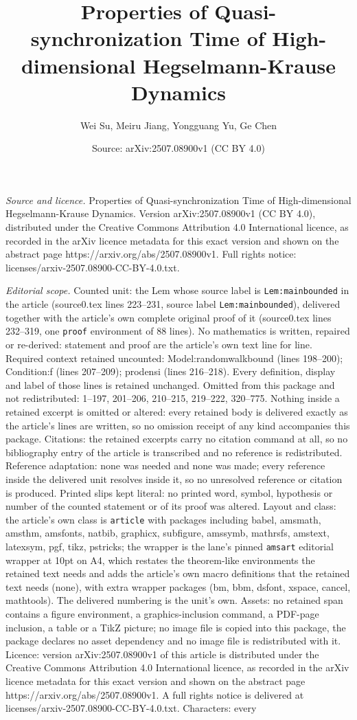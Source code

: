 \documentclass[10pt,a4paper]{amsart}
\title[Properties of Quasi-synchronization Time of High-dimensional]{Properties of Quasi-synchronization Time of High-dimensional Hegselmann-Krause Dynamics}
\author{Wei Su, Meiru Jiang, Yongguang Yu, Ge Chen}
\date{Source: arXiv:2507.08900v1 (CC BY 4.0)}
\begin{document}
\maketitle

\noindent\emph{Source and licence.} Properties of Quasi-synchronization Time of High-dimensional Hegselmann-Krause Dynamics. Version arXiv:2507.08900v1 (CC BY 4.0), distributed under the Creative Commons Attribution 4.0 International licence, as recorded in the arXiv licence metadata for this exact version and shown on the abstract page https://arxiv.org/abs/2507.08900v1. Full rights notice: licenses/arxiv-2507.08900-CC-BY-4.0.txt.\par\smallskip

\noindent\textit{Editorial scope.} Counted unit: the Lem whose source label is \texttt{Lem:mainbounded} in the article (source0.tex lines 223--231, source label \texttt{Lem:mainbounded}), delivered together with the article's own complete original proof of it (source0.tex lines 232--319, one \texttt{proof} environment of 88 lines). No mathematics is written, repaired or re-derived: statement and proof are the article's own text line for line. Required context retained uncounted: Model:randomwalkbound (lines 198--200); Condition:f (lines 207--209); prodensi (lines 216--218). Every definition, display and label of those lines is retained unchanged. Omitted from this package and not redistributed: 1--197, 201--206, 210--215, 219--222, 320--775. Nothing inside a retained excerpt is omitted or altered: every retained body is delivered exactly as the article's lines are written, so no omission receipt of any kind accompanies this package. Citations: the retained excerpts carry no citation command at all, so no bibliography entry of the article is transcribed and no reference is redistributed. Reference adaptation: none was needed and none was made; every reference inside the delivered unit resolves inside it, so no unresolved reference or citation is produced. Printed slips kept literal: no printed word, symbol, hypothesis or number of the counted statement or of its proof was altered. Layout and class: the article's own class is \texttt{article} with packages including babel, amsmath, amsthm, amsfonts, natbib, graphicx, subfigure, amssymb, mathrsfs, amstext, latexsym, pgf, tikz, pstricks; the wrapper is the lane's pinned \texttt{amsart} editorial wrapper at 10pt on A4, which restates the theorem-like environments the retained text needs and adds the article's own macro definitions that the retained text needs (none), with extra wrapper packages (bm, bbm, dsfont, xspace, cancel, mathtools). The delivered numbering is the unit's own. Assets: no retained span contains a figure environment, a graphics-inclusion command, a PDF-page inclusion, a table or a TikZ picture; no image file is copied into this package, the package declares no asset dependency and no image file is redistributed with it. Licence: version arXiv:2507.08900v1 of this article is distributed under the Creative Commons Attribution 4.0 International licence, as recorded in the arXiv licence metadata for this exact version and shown on the abstract page https://arxiv.org/abs/2507.08900v1. A full rights notice is delivered at licenses/arxiv-2507.08900-CC-BY-4.0.txt. Characters: every 
\end{document}
